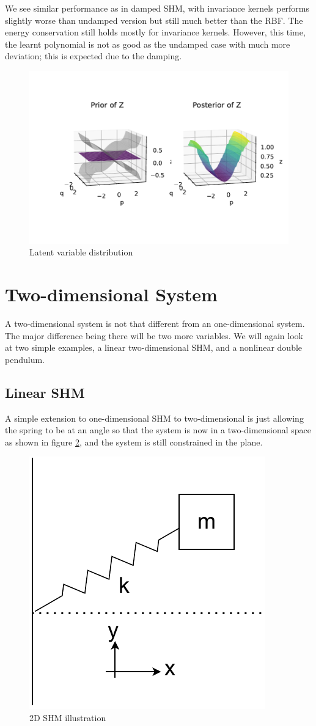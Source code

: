 \documentclass{statsmsc}
\begin{document}
We see similar performance as in damped SHM, with invariance kernels performs slightly worse than undamped version but still much better than the RBF.
The energy conservation still holds mostly for invariance kernels.
However, this time, the learnt polynomial is not as good as the undamped case with much more deviation; this is expected due to the damping.

\begin{figure}[H] 
  \includegraphics[width=0.8\linewidth]{../codes/figures/latent_damped_pendulum.pdf}
  \centering
  \caption{Latent variable distribution}
  \label{fig:latent_damped_pendulum}
\end{figure}

\section{Two-dimensional System}
A two-dimensional system is not that different from an one-dimensional system. The major difference being there will be two more variables. 
We will again look at two simple examples, a linear two-dimensional SHM, and a nonlinear double pendulum.

\subsection{Linear SHM}
A simple extension to one-dimensional SHM to two-dimensional is just allowing the spring to be at an angle so that the system is now in a two-dimensional space as shown in figure \ref{fig:shm_2d_diagram}, and the system is still constrained in the plane.

\begin{figure}[H]
        \centering
        \includegraphics[width=0.4\linewidth]{../figures/2dshm.pdf}
        \caption{2D SHM illustration}
        \label{fig:shm_2d_diagram}
\end{figure}
\end{document}
